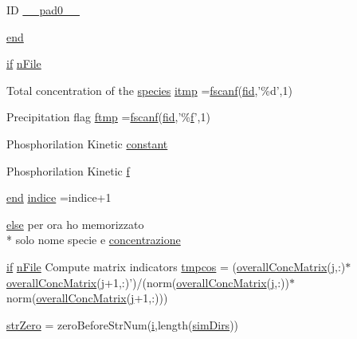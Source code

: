 \begin{DoxyCompactItemize}
\item 
I\-D \hyperlink{a00025_a1bd174db58293f9130ed98bb375ccc03}{\-\_\-\-\_\-pad0\-\_\-\-\_\-}
\item 
\hyperlink{a00025_afb358f48b1646c750fb9da6c6585be2b}{end}
\item 
\hyperlink{a00030_a01d55766b8058903dd360b4bda71f9f5}{if} \hyperlink{a00025_a0df074de7bfa18238647c0c8b555316e}{n\-File}
\item 
Total concentration of the \hyperlink{a00022}{species} \hyperlink{a00025_af17812863fb385a507b5b07ed6166569}{itmp} =\hyperlink{a00025_a028ac102a731e62fb0a7439381f566c1}{fscanf}(\hyperlink{a00031_ae9011d40c6f13e68e6f07156e0da7c5d}{fid},'\%d',1)
\item 
Precipitation flag \hyperlink{a00025_ad82fa813707dc406b75a0b6e38d45a3e}{ftmp} =\hyperlink{a00025_a028ac102a731e62fb0a7439381f566c1}{fscanf}(\hyperlink{a00031_ae9011d40c6f13e68e6f07156e0da7c5d}{fid},'\%\hyperlink{a00025_a9c5a71c46b1abb8b7df5ebeac6c81535}{f}',1)
\item 
Phosphorilation Kinetic \hyperlink{a00025_a163bb0e728c363ddfbd84725ee4bcbf1}{constant}
\item 
Phosphorilation Kinetic \hyperlink{a00025_a9c5a71c46b1abb8b7df5ebeac6c81535}{f}
\item 
\hyperlink{a00025_afb358f48b1646c750fb9da6c6585be2b}{end} \hyperlink{a00025_a776b2bbd08be028d44f6d4260f27633a}{indice} =indice+1
\item 
\hyperlink{a00031_af5946383720aa572eb93e1e63afc23c2}{else} per ora ho memorizzato \\*
solo nome specie e \hyperlink{a00025_a5acf1fa9f8d0cb2ab8b1505ffd4dce5b}{concentrazione}
\item 
\hyperlink{a00030_a01d55766b8058903dd360b4bda71f9f5}{if} \hyperlink{a00025_a0df074de7bfa18238647c0c8b555316e}{n\-File} Compute matrix indicators \hyperlink{a00025_ab6beb59ba238329bfb9d4ed5a5486c5e}{tmpcos} = (\hyperlink{a00025_a576dd8edd1b0fd4cc65709a59b308518}{overall\-Conc\-Matrix}(\hyperlink{a00110_ac86694252f8dfdb19aaeadc4b7c342c6}{j},\-:)$\ast$\hyperlink{a00025_a576dd8edd1b0fd4cc65709a59b308518}{overall\-Conc\-Matrix}(\hyperlink{a00110_ac86694252f8dfdb19aaeadc4b7c342c6}{j}+1,\-:)')/(norm(\hyperlink{a00025_a576dd8edd1b0fd4cc65709a59b308518}{overall\-Conc\-Matrix}(\hyperlink{a00110_ac86694252f8dfdb19aaeadc4b7c342c6}{j},\-:))$\ast$norm(\hyperlink{a00025_a576dd8edd1b0fd4cc65709a59b308518}{overall\-Conc\-Matrix}(\hyperlink{a00110_ac86694252f8dfdb19aaeadc4b7c342c6}{j}+1,\-:)))
\item 
\hyperlink{a00025_ab253e75f6224bf843e7a5ff2fb472e7d}{str\-Zero} = zero\-Before\-Str\-Num(\hyperlink{a00113_ad3efca1ea6e3333daf30719ee0501862}{i},length(\hyperlink{a00031_aae5035eb84b89176ed5b06e136325eff}{sim\-Dirs}))

\end{DoxyCompactItemize}
